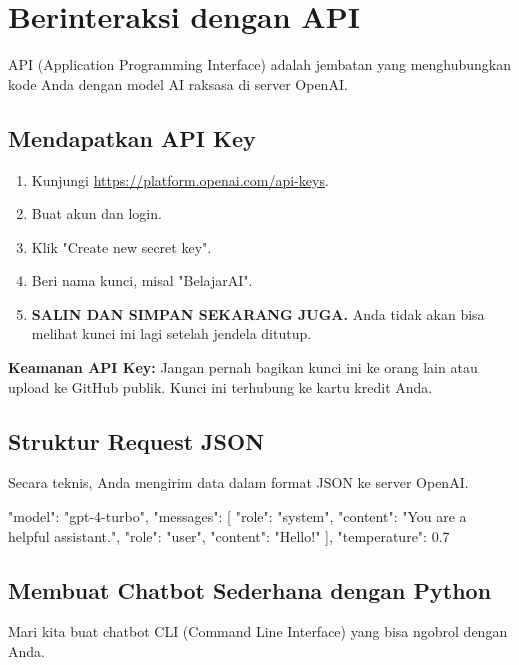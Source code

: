 \chapter{Berinteraksi dengan API}
\label{chap:apis}

API (Application Programming Interface) adalah jembatan yang menghubungkan kode Anda dengan model AI raksasa di server OpenAI.

\section{Mendapatkan API Key}

\begin{enumerate}
    \item Kunjungi \url{https://platform.openai.com/api-keys}.
    \item Buat akun dan login.
    \item Klik "Create new secret key".
    \item Beri nama kunci, misal "BelajarAI".
    \item \textbf{SALIN DAN SIMPAN SEKARANG JUGA.} Anda tidak akan bisa melihat kunci ini lagi setelah jendela ditutup.
\end{enumerate}

\begin{tipbox}
\textbf{Keamanan API Key:}
Jangan pernah bagikan kunci ini ke orang lain atau upload ke GitHub publik. Kunci ini terhubung ke kartu kredit Anda.
\end{tipbox}

\section{Struktur Request JSON}

Secara teknis, Anda mengirim data dalam format JSON ke server OpenAI.

\begin{codeblock}[title=Contoh Request JSON]
{
  "model": "gpt-4-turbo",
  "messages": [
    {"role": "system", "content": "You are a helpful assistant."},
    {"role": "user", "content": "Hello!"}
  ],
  "temperature": 0.7
}
\end{codeblock}

\section{Membuat Chatbot Sederhana dengan Python}

Mari kita buat chatbot CLI (Command Line Interface) yang bisa ngobrol dengan Anda.

